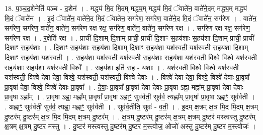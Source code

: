 \documentclass[17pt]{extarticle}
\begin{document}
18. प॒ञ्च॒द॒शेनेति॑ पञ्च - द॒शेन॑ । . मद्ध्य॑ मि॒द मि॒दम् मद्ध्य॒म् मद्ध्य॑ मि॒दं ॅवाते॑न॒ वाते॑ने॒दम् मद्ध्य॒म् मद्ध्य॑ मि॒दं ॅवाते॑न । . इ॒दं ॅवाते॑न॒ वाते॑ने॒द मि॒दं ॅवाते॑न॒ सग॑रेण॒ सग॑रेण॒ वाते॑ने॒द मि॒दं ॅवाते॑न॒ सग॑रेण । . वाते॑न॒ सग॑रेण॒ सग॑रेण॒ वाते॑न॒ वाते॑न॒ सग॑रेण रक्ष रक्ष॒ सग॑रेण॒ वाते॑न॒ वाते॑न॒ सग॑रेण रक्ष । . सग॑रेण रक्ष रक्ष॒ सग॑रेण॒ सग॑रेण रक्ष । . र॒क्षेति॑ रक्ष । . प्राची॑ दि॒शाम् दि॒शाम् प्राची॒ प्राची॑ दि॒शाꣳ स॒हय॑शाः स॒हय॑शा दि॒शाम् प्राची॒ प्राची॑ दि॒शाꣳ स॒हय॑शाः । . दि॒शाꣳ स॒हय॑शाः स॒हय॑शा दि॒शाम् दि॒शाꣳ स॒हय॑शा॒ यश॑स्वती॒ यश॑स्वती स॒हय॑शा दि॒शाम् दि॒शाꣳ स॒हय॑शा॒ यश॑स्वती । . स॒हय॑शा॒ यश॑स्वती॒ यश॑स्वती स॒हय॑शाः स॒हय॑शा॒ यश॑स्वती॒ विश्वे॒ विश्वे॒ यश॑स्वती स॒हय॑शाः स॒हय॑शा॒ यश॑स्वती॒ विश्वे᳚ । . स॒हय॑शा॒ इति॑ स॒ह - य॒शाः॒ । . यश॑स्वती॒ विश्वे॒ विश्वे॒ यश॑स्वती॒ यश॑स्वती॒ विश्वे॑ देवा देवा॒ विश्वे॒ यश॑स्वती॒ यश॑स्वती॒ विश्वे॑ देवाः । . विश्वे॑ देवा देवा॒ विश्वे॒ विश्वे॑ देवाः प्रा॒वृषा᳚ प्रा॒वृषा॑ देवा॒ विश्वे॒ विश्वे॑ देवाः प्रा॒वृषा᳚ । . दे॒वाः॒ प्रा॒वृषा᳚ प्रा॒वृषा॑ देवा देवाः प्रा॒वृषा ऽह्ना॒ मह्ना᳚म् प्रा॒वृषा॑ देवा देवाः प्रा॒वृषा ऽह्ना᳚म् । . प्रा॒वृषा ऽह्ना॒ मह्ना᳚म् प्रा॒वृषा᳚ प्रा॒वृषा ऽह्नाꣳ॒॒ सुव॑र्वती॒ सुव॑र्व॒ त्यह्ना᳚म् प्रा॒वृषा᳚ प्रा॒वृषा ऽह्नाꣳ॒॒ सुव॑र्वती । . अह्नाꣳ॒॒ सुव॑र्वती॒ सुव॑र्व॒ त्यह्ना॒ मह्नाꣳ॒॒ सुव॑र्वती । . सुव॑र्व॒तीति॒ सुवः॑ - व॒ती॒ । . इ॒दम् क्ष॒त्रम् क्ष॒त्र मि॒द मि॒दम् क्ष॒त्रम् दु॒ष्टर॑म् दु॒ष्टर॑म् क्ष॒त्र मि॒द मि॒दम् क्ष॒त्रम् दु॒ष्टर᳚म् । . क्ष॒त्रम् दु॒ष्टर॑म् दु॒ष्टर॑म् क्ष॒त्रम् क्ष॒त्रम् दु॒ष्टर॑ मस्त्वस्तु दु॒ष्टर॑म् क्ष॒त्रम् क्ष॒त्रम् दु॒ष्टर॑ मस्तु । . दु॒ष्टर॑ मस्त्वस्तु दु॒ष्टर॑म् दु॒ष्टर॑ म॒स्त्वोज॒ ओजो॑ अस्तु दु॒ष्टर॑म् दु॒ष्टर॑ म॒स्त्वोजः॑ । \newline
\end{document}
